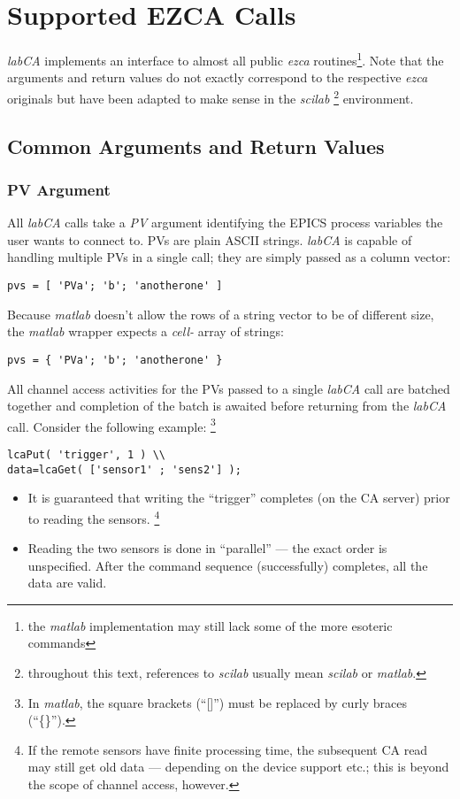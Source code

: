 \documentclass{article}
\newcommand{\sca}{\ita{labCA}}
\newcommand{\scilab}{\ita{scilab}}
\newcommand{\matlab}{\ita{matlab}}
\newcommand{\ezca}{\ita{ezca}}
\newcommand{\pbrk}{\pagebreak[3]}
\newcommand{\ita}[1]{\emph{#1}}
\renewcommand{\pbrk}{}
\begin{document}
\vspace*{\fill}
\pbrk
\section{Supported EZCA Calls}
\sca{} implements an interface to almost all public
\ezca{} routines\footnote{%
the \matlab{} implementation may still lack some of the
more esoteric commands}. Note that the arguments and
return values do not exactly correspond to the respective
\ezca{} originals but have been adapted to make sense
in the  \scilab{}%
\footnote{throughout this text, references to \scilab{}
usually mean \scilab{} or \matlab.}
environment.

\subsection{Common Arguments and Return Values}
\subsubsection{PV Argument}
All \sca{} calls take a \ita{PV} argument identifying
the EPICS process variables the user wants to connect to.
PVs are plain ASCII strings. \sca{} is capable of handling
multiple PVs in a single call; they are simply passed as a
column vector:
\begin{verbatim}
pvs = [ 'PVa'; 'b'; 'anotherone' ]
\end{verbatim}
Because \matlab{} doesn't allow the rows of
a string vector to be of different size, the \matlab{}
wrapper expects a \ita{cell-} array of strings:
\begin{verbatim}
pvs = { 'PVa'; 'b'; 'anotherone' }
\end{verbatim}

All channel access activities for the PVs
passed to a single \sca{} call are batched together and
completion of the batch is awaited before returning from
the \sca{} call. Consider the following example:%
\footnote{
In \matlab{}, the square brackets (``[]'') must be replaced
by curly braces (``\{\}'').}
\begin{verbatim}
lcaPut( 'trigger', 1 ) \\
data=lcaGet( ['sensor1' ; 'sens2'] );
\end{verbatim}
\begin{itemize}
%
\item It is guaranteed that writing the ``trigger''
completes (on the CA server) prior to reading the
sensors.%
\footnote{If the remote sensors have finite
processing time, the subsequent CA read may still
get old data --- depending on the device support
etc.; this is beyond the scope of channel access, however.}
%
\item Reading the two sensors is done in ``parallel'' ---
the exact order is unspecified. After the command sequence
(successfully) completes, all the data are valid.
\end{itemize}
\end{document}

